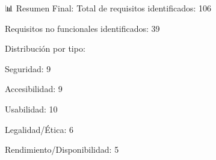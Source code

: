 📊 Resumen Final:
Total de requisitos identificados: 106

Requisitos no funcionales identificados: 39

Distribución por tipo:

Seguridad: 9

Accesibilidad: 9

Usabilidad: 10

Legalidad/Ética: 6

Rendimiento/Disponibilidad: 5

